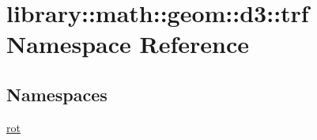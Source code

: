\hypertarget{namespacelibrary_1_1math_1_1geom_1_1d3_1_1trf}{}\section{library\+:\+:math\+:\+:geom\+:\+:d3\+:\+:trf Namespace Reference}
\label{namespacelibrary_1_1math_1_1geom_1_1d3_1_1trf}
\subsection*{Namespaces}
\begin{DoxyCompactItemize}
\item 
 \hyperlink{namespacelibrary_1_1math_1_1geom_1_1d3_1_1trf_1_1rot}{rot}
\end{DoxyCompactItemize}
